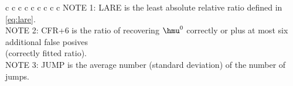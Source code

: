 \documentclass[12pt]{article}
\begin{document}
\begin{table} [h]
\begin{center}
{\begin{tabular} {c c c  c c c    c c c  }
        \hline\hline
   {\footnotesize{NOTE 1: LARE is the least absolute relative ratio defined in \eqref{eq:lare}.}}\\
   {\footnotesize{NOTE 2: CFR+6 is the ratio of recovering $\hmu^0$
                       correctly or plus at most six additional false posives}}\\
   {\footnotesize{   \quad\quad\quad\quad                   (correctly fitted ratio). }}\\
   {\footnotesize{NOTE 3: JUMP is the average number (standard deviation)  of the number of jumps.}}
   \end{tabular}}
  \end{center}
  \end{table}
\end{document}
